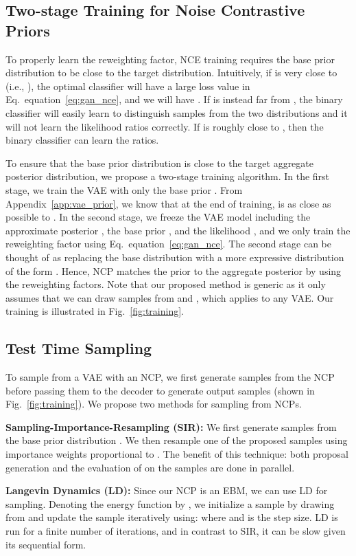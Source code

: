 \documentclass{article} \usepackage{iclr2021_conference,times}
\def\eqref#1{equation~\ref{#1}}
\begin{document}
\subsection{Two-stage Training for Noise Contrastive Priors}
To properly learn the reweighting factor, NCE training requires the base prior distribution to be close to the target distribution. Intuitively, if  is very close to  (i.e., ), the optimal classifier will have a large loss value in Eq.~\eqref{eq:gan_nce}, and we will have . If  is instead far from , the binary classifier will easily learn to distinguish samples from the two distributions and it will not learn the likelihood ratios correctly. If  is roughly close to , then the binary classifier can learn the ratios.

To ensure that the base prior distribution is close to the target aggregate posterior distribution, we propose a two-stage training algorithm. In the first stage, we train the VAE with only the base prior . From Appendix~\ref{app:vae_prior}, we know that at the end of training,  is as close as possible to . In the second stage, we freeze the VAE model including the approximate posterior , the base prior , and the likelihood , and we only train the reweighting factor  using Eq.~\eqref{eq:gan_nce}. The second stage can be thought of as replacing the base distribution  with a more expressive distribution of the form . Hence, NCP matches the prior to the aggregate posterior  by using the reweighting factors. Note that our proposed method is generic as it only assumes that we can draw samples from  and , which applies to any VAE. Our training is illustrated in Fig.~\ref{fig:training}.


\subsection{Test Time Sampling}
To sample from a VAE with an NCP, we first generate samples from the NCP before passing them to the decoder to generate output samples (shown in Fig.~\ref{fig:training}). We propose two methods for sampling from NCPs.

\textbf{Sampling-Importance-Resampling (SIR):} We first generate  samples from the base prior distribution . We then resample one of the  proposed samples using importance weights proportional to . The benefit of this technique: both proposal generation and the evaluation of  on the samples are done in parallel.


\textbf{Langevin Dynamics (LD):} Since our NCP is an EBM, we can use LD for sampling. Denoting the energy function by , we initialize a sample  by drawing from  and  update the sample iteratively using:  where  and  is the step size. LD is run for a finite number of iterations, and in contrast to SIR, it can be slow given its sequential form. 
\end{document}
